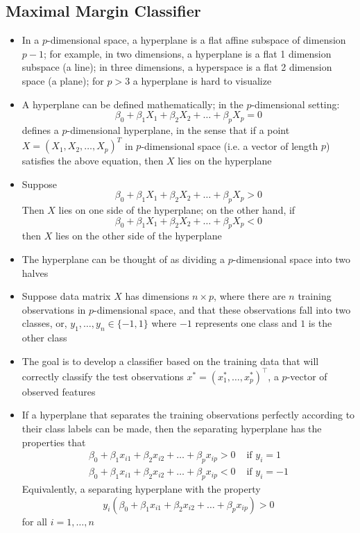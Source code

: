 \documentclass[12pt]{article}
\begin{document}
\subsection{Maximal Margin Classifier}
\begin{itemize} 
\item In a $p$-dimensional space, a hyperplane is a flat affine subspace of dimension $p-1$; for example, in two dimensions, a hyperplane is a flat 1 dimension subspace (a line); in three dimensions, a hyperspace is a flat 2 dimension space (a plane); for $p > 3$ a hyperplane is hard to visualize
\item A hyperplane can be defined mathematically; in the $p$-dimensional setting: $$ \beta_0 + \beta_1X_1 + \beta_2X_2 + \dots + \beta_pX_p = 0 $$ defines a $p$-dimensional hyperplane, in the sense that if a point $X = (X_1,X_2,\dots,X_p)^T$ in $p$-dimensional space (i.e. a vector of length $p$) satisfies the above equation, then $X$ lies on the hyperplane 
\item Suppose $$\beta_0 + \beta_1X_1 + \beta_2X_2 + \dots + \beta_pX_p > 0 $$ Then $X$ lies on one side of the hyperplane; on the other hand, if $$ \beta_0 + \beta_1X_1 + \beta_2X_2 + \dots + \beta_pX_p < 0 $$ then $X$ lies on the other side of the hyperplane 
\item The hyperplane can be thought of as dividing a $p$-dimensional space into two halves 
\item Suppose data matrix $X$ has dimensions $n \times p$, where there are $n$ training observations in $p$-dimensional space, and that these observations fall into two classes, or, $y_1,\dots,y_n \in \{-1,1\}$ where $-1$ represents one class and $1$ is the other class
\item The goal is to develop a classifier based on the training data that will correctly classify the test observations $x^* = (x_1^\ast ,\dots,x_p^\ast)^\top$, a $p$-vector of observed features 
\item If a hyperplane that separates the training observations perfectly according to their class labels can be made, then the separating hyperplane has the properties that $$ \begin{aligned} \beta_0 + \beta_1x_{i1} + \beta_2x_{i2} + \dots + \beta_px_{ip} > 0 &\text{ if } y_i = 1 \\ \beta_0 + \beta_1x_{i1} + \beta_2x_{i2} + \dots + \beta_px_{ip} < 0 &\text{ if } y_i = -1 \end{aligned} $$ 
Equivalently, a separating hyperplane with the property $$ y_i(\beta_0 + \beta_1x_{i1} + \beta_2x_{i2} + \dots + \beta_px_{ip}) > 0 $$ for all $i = 1,\dots,n$ 

\end{itemize}
\end{document}
